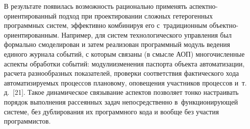\begin{multicols}{2}
 В результате появилась возможность рационально применять
 ас\-пект\-но-ори\-ен\-ти\-ро\-ван\-ный подход при проектировании сложных
гетерогенных программных систем, эффективно комбинируя его
с~традиционным объектно-ориентированным. Например, для систем
технологического управления был формально смоделирован и затем реализован
программный модуль ведения единого журнала событий, с которым связаны (в
смысле АОП) многочисленные аспекты обработки событий: модули\linebreak изменения
паспорта объекта автоматизации, рас\-чета разнообразных показателей, проверки
соответствия фактического хода автоматизируемых процес\-сов плановому,
оповещения участников процес\-сов и~т.\,д.~[21]. Такое динамическое
связывание аспектов позволяет тонко настраивать порядок выполнения
рассеянных задач непосредственно в~функционирующей системе, без
дублирования их программного кода и вообще без участия программистов.


\end{multicols}
